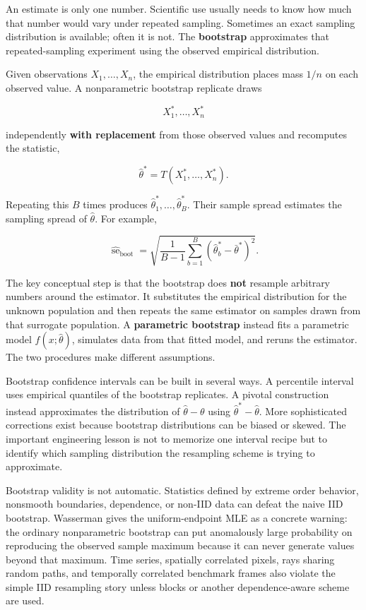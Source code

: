 An estimate is only one number. Scientific use usually needs to know how much that number would vary under repeated sampling. Sometimes an exact sampling distribution is available; often it is not. The \textbf{bootstrap} approximates that repeated-sampling experiment using the observed empirical distribution.

Given observations \(X_1,\ldots,X_n\), the empirical distribution places mass \(1/n\) on each observed value. A nonparametric bootstrap replicate draws

\[
X_1^*,\ldots,X_n^*
\]

independently \textbf{with replacement} from those observed values and recomputes the statistic,

\[
\hat\theta^*=T(X_1^*,\ldots,X_n^*).
\]

Repeating this \(B\) times produces \(\hat\theta_1^*,\ldots,\hat\theta_B^*\). Their sample spread estimates the sampling spread of \(\hat\theta\). For example,

\[
\widehat{\operatorname{se}}_{\mathrm{boot}}
=
\sqrt{
\frac{1}{B-1}
\sum_{b=1}^{B}
(\hat\theta_b^*-\bar{\theta}^*)^2
}.
\]

The key conceptual step is that the bootstrap does \textbf{not} resample arbitrary numbers around the estimator. It substitutes the empirical distribution for the unknown population and then repeats the same estimator on samples drawn from that surrogate population. A \textbf{parametric bootstrap} instead fits a parametric model \(f(x;\hat\theta)\), simulates data from that fitted model, and reruns the estimator. The two procedures make different assumptions.

Bootstrap confidence intervals can be built in several ways. A percentile interval uses empirical quantiles of the bootstrap replicates. A pivotal construction instead approximates the distribution of \(\hat\theta-\theta\) using \(\hat\theta^*-\hat\theta\). More sophisticated corrections exist because bootstrap distributions can be biased or skewed. The important engineering lesson is not to memorize one interval recipe but to identify which sampling distribution the resampling scheme is trying to approximate.

Bootstrap validity is not automatic. Statistics defined by extreme order behavior, nonsmooth boundaries, dependence, or non-IID data can defeat the naive IID bootstrap. Wasserman gives the uniform-endpoint MLE as a concrete warning: the ordinary nonparametric bootstrap can put anomalously large probability on reproducing the observed sample maximum because it can never generate values beyond that maximum. Time series, spatially correlated pixels, rays sharing random paths, and temporally correlated benchmark frames also violate the simple IID resampling story unless blocks or another dependence-aware scheme are used.

